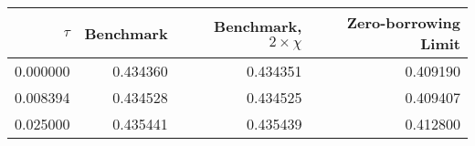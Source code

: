 \begin{tabular}{rrrr}
\toprule
   $\tau$ &  Benchmark &  Benchmark, $2 \times \chi$ &  Zero-borrowing Limit \\
\midrule
 0.000000 &   0.434360 &                    0.434351 &              0.409190 \\
 0.008394 &   0.434528 &                    0.434525 &              0.409407 \\
 0.025000 &   0.435441 &                    0.435439 &              0.412800 \\
\bottomrule
\end{tabular}
